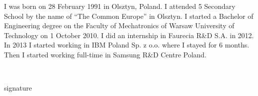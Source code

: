 	I was born on 28 February 1991 in Olsztyn, Poland. I attended 5 Secondary School by the name of ``The Common Europe'' in Olsztyn. I started a Bachelor of Engineering degree on the Faculty of Mechatronics of Warsaw University of Technology on 1 October 2010. I did an internship in Faurecia R\&D S.A. in 2012. In 2013 I started working in IBM Poland Sp. z o.o. where I stayed for 6 months. Then I started working full-time in Samsung R\&D Centre Poland.
	
    \par
    \vspace{3\baselineskip}
    \hfill\parbox{15em}{{\small\dotfill}\\[-.3ex]
    \centerline{\footnotesize signature}}\par
    \vspace{3\baselineskip}